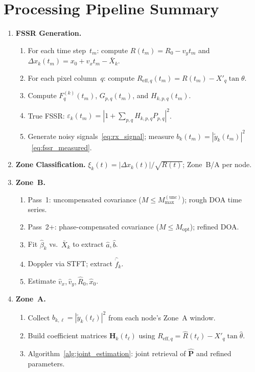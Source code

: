 \documentclass[11pt,a4paper]{article}
\begin{document}
\section{Processing Pipeline Summary}
\label{sec:pipeline}

\begin{enumerate}
  \item \textbf{FSSR Generation.}
    \begin{enumerate}
      \item For each time step~$t_m$: compute $R(t_m)=R_0-v_y t_m$
        and $\Delta x_k(t_m)=x_0+v_x t_m-\bar{X}_k$.
      \item For each pixel column~$q$: compute
        $R_{\mathrm{eff},q}(t_m)=R(t_m)-X'_q\tan\theta$.
      \item Compute $F_q^{(k)}(t_m)$, $G_{p,q}(t_m)$, and
        $H_{k,p,q}(t_m)$.
      \item True FSSR: $\varepsilon_k(t_m)=|1+\sum_{p,q}
        H_{k,p,q}P_{p,q}|^2$.
      \item Generate noisy signals~\eqref{eq:rx_signal}; measure
        $b_k(t_m)=|\tilde{y}_k(t_m)|^2$~\eqref{eq:fssr_measured}.
    \end{enumerate}

  \item \textbf{Zone Classification.}
    $\xi_k(t)=|\Delta x_k(t)|/\sqrt{R(t)}$; Zone~B/A per node.

  \item \textbf{Zone~B.}
    \begin{enumerate}
      \item Pass~1: uncompensated covariance ($M\le
        M_{\max}^{(\mathrm{unc})}$); rough DOA time series.
      \item Pass~2+: phase-compensated covariance ($M\le
        M_{\mathrm{opt}}$); refined DOA.
      \item Fit $\hat{\beta}_k$ vs.\ $\bar{X}_k$ to extract
        $\hat{a},\hat{b}$.
      \item Doppler via STFT; extract $\hat{\dot{f}}_k$.
      \item Estimate $\hat{v}_x,\hat{v}_y,\hat{R}_0,\hat{x}_0$.
    \end{enumerate}

  \item \textbf{Zone~A.}
    \begin{enumerate}
      \item Collect $b_{k,\ell}=|\tilde{y}_k(t_\ell)|^2$ from each
        node's Zone~A window.
      \item Build coefficient matrices $\mathbf{H}_k(t_\ell)$ using
        $R_{\mathrm{eff},q}=\hat{R}(t_\ell)-X'_q\tan\hat{\theta}$.
      \item Algorithm~\ref{alg:joint_estimation}: joint retrieval of
        $\hat{\mathbf{P}}$ and refined parameters.
    \end{enumerate}


\end{enumerate}
\end{document}
